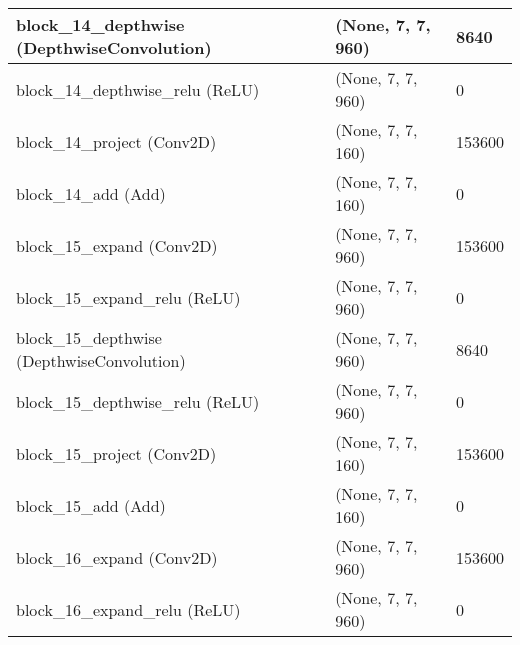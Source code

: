 \documentclass{article}
\begin{document}
\begin{center}
\begin{longtable}[h]{ p{}  p{}  p{}}
block\_14\_depthwise (DepthwiseConvolution)        & (None, 7, 7, 960)    & 8640     \\ \hline
block\_14\_depthwise\_relu (ReLU)                  & (None, 7, 7, 960)    & 0        \\ \hline
block\_14\_project (Conv2D)                        & (None, 7, 7, 160)    & 153600   \\ \hline
block\_14\_add (Add)                               & (None, 7, 7, 160)    & 0        \\ \hline
block\_15\_expand (Conv2D)                         & (None, 7, 7, 960)    & 153600   \\ \hline
block\_15\_expand\_relu (ReLU)                     & (None, 7, 7, 960)    & 0        \\ \hline
block\_15\_depthwise (DepthwiseConvolution)        & (None, 7, 7, 960)    & 8640     \\ \hline
block\_15\_depthwise\_relu (ReLU)                  & (None, 7, 7, 960)    & 0        \\ \hline
block\_15\_project (Conv2D)                        & (None, 7, 7, 160)    & 153600   \\ \hline
block\_15\_add (Add)                               & (None, 7, 7, 160)    & 0        \\ \hline
block\_16\_expand (Conv2D)                         & (None, 7, 7, 960)    & 153600   \\ \hline
block\_16\_expand\_relu (ReLU)                     & (None, 7, 7, 960)    & 0        \\ \hline

\end{longtable}
\end{center}
\end{document}
